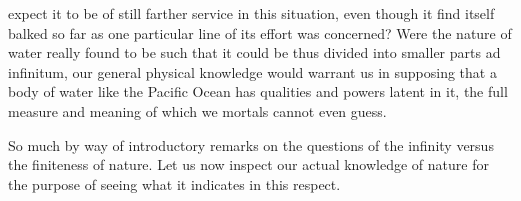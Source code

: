 \documentclass[a4paper, 11pt, oneside, polutonikogreek, english, landscape]{article}
\begin{document}
expect it to be of still farther service in this situation, even though it find itself balked so far as one particular line of its effort was concerned? Were the nature of water really found to be such that it could be thus divided into smaller parts ad infinitum, our general physical knowledge would warrant us in supposing that a body of water like the Pacific Ocean has qualities and powers latent in it, the full measure and meaning of which we mortals cannot even guess.

So much by way of introductory remarks on the questions of the infinity versus the finiteness of nature. Let us now inspect our actual knowledge of nature for the purpose of seeing what it indicates in this respect.

\subsection{}
\end{document}
